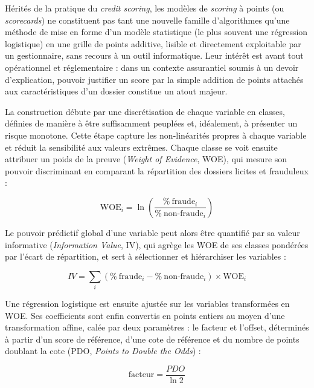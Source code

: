 Hérités de la pratique du \textit{credit scoring}, les modèles de \textit{scoring} à points (ou \textit{scorecards}) ne constituent pas tant une nouvelle famille d'algorithmes qu'une méthode de mise en forme d'un modèle statistique (le plus souvent une régression logistique) en une grille de points additive, lisible et directement exploitable par un gestionnaire, sans recours à un outil informatique. Leur intérêt est avant tout opérationnel et réglementaire : dans un contexte assurantiel soumis à un devoir d'explication, pouvoir justifier un score par la simple addition de points attachés aux caractéristiques d'un dossier constitue un atout majeur.

La construction débute par une discrétisation de chaque variable en classes, définies de manière à être suffisamment peuplées et, idéalement, à présenter un risque monotone. Cette étape capture les non-linéarités propres à chaque variable et réduit la sensibilité aux valeurs extrêmes. Chaque classe se voit ensuite attribuer un poids de la preuve (\textit{Weight of Evidence}, WOE), qui mesure son pouvoir discriminant en comparant la répartition des dossiers licites et frauduleux :

\begin{equation}
    \text{WOE}_i = \ln \left( \frac{\%\ \text{fraude}_i}{\%\ \text{non-fraude}_i} \right)
\end{equation}

Le pouvoir prédictif global d'une variable peut alors être quantifié par sa valeur informative (\textit{Information Value}, IV), qui agrège les WOE de ses classes pondérées par l'écart de répartition, et sert à sélectionner et hiérarchiser les variables :

\begin{equation}
    IV = \sum_i \left( \%\ \text{fraude}_i - \%\ \text{non-fraude}_i \right) \times \text{WOE}_i
\end{equation}

Une régression logistique est ensuite ajustée sur les variables transformées en WOE. Ses coefficients sont enfin convertis en points entiers au moyen d'une transformation affine, calée par deux paramètres : le facteur et l'offset, déterminés à partir d'un score de référence, d'une cote de référence et du nombre de points doublant la cote (PDO, \textit{Points to Double the Odds}) :

\begin{equation}
    \text{facteur} = \frac{PDO}{\ln 2}
\end{equation}

